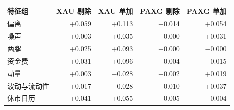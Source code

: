 \begin{tabular}{lrrrr}
\toprule
特征组 & XAU 剔除 & XAU 单加 & PAXG 剔除 & PAXG 单加 \\
\midrule
偏离 & +0.059 & +0.113 & +0.014 & +0.054 \\
噪声 & +0.003 & +0.035 & −0.000 & +0.031 \\
两腿 & +0.025 & +0.093 & −0.000 & −0.000 \\
资金费 & +0.031 & +0.096 & +0.004 & −0.015 \\
动量 & +0.003 & −0.028 & −0.002 & +0.019 \\
波动与流动性 & +0.017 & −0.028 & +0.010 & +0.037 \\
休市日历 & +0.041 & +0.055 & −0.005 & −0.004 \\
\bottomrule
\end{tabular}
